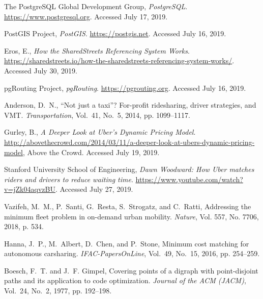 \documentclass[]{trbunofficial_bdit_final}
\begin{document}
\begin{thebibliography}{33}
{The PostgreSQL Global Development Group}, \emph{{PostgreSQL}}.
  \url{https://www.postgresql.org}. Accessed July 17, 2019.

{PostGIS Project}, \emph{{PostGIS}}. \url{https://postgis.net}. Accessed July
  16, 2019.

Eros, E., \emph{How the SharedStreets Referencing System Works}.
  \url{https://sharedstreets.io/how-the-sharedstreets-referencing-system-works/}.
  Accessed July 30, 2019.

{pgRouting Project}, \emph{{pgRouting}}. \url{https://pgrouting.org}. Accessed
  July 16, 2019.

Anderson, D.~N., ``Not just a taxi''? For-profit ridesharing, driver
  strategies, and VMT. \emph{Transportation}, Vol.~41, No.~5, 2014, pp.
  1099--1117.

Gurley, B., \emph{A Deeper Look at Uber's Dynamic Pricing Model}.
  \url{http://abovethecrowd.com/2014/03/11/a-deeper-look-at-ubers-dynamic-pricing-model},
  Above the Crowd. Accessed July 19, 2019.

{Stanford University School of Engineering}, \emph{Dawn Woodward: How Uber
  matches riders and drivers to reduce waiting time}.
  \url{https://www.youtube.com/watch?v=jZk04aqvzBU}. Accessed July 27, 2019.

Vazifeh, M.~M., P.~Santi, G.~Resta, S.~Strogatz, and C.~Ratti, Addressing the
  minimum fleet problem in on-demand urban mobility. \emph{Nature}, Vol. 557,
  No. 7706, 2018, p. 534.

Hanna, J.~P., M.~Albert, D.~Chen, and P.~Stone, Minimum cost matching for
  autonomous carsharing. \emph{IFAC-PapersOnLine}, Vol.~49, No.~15, 2016, pp.
  254--259.

Boesch, F.~T. and J.~F. Gimpel, Covering points of a digraph with
  point-disjoint paths and its application to code optimization. \emph{Journal
  of the ACM (JACM)}, Vol.~24, No.~2, 1977, pp. 192--198.


\end{thebibliography}
\end{document}
